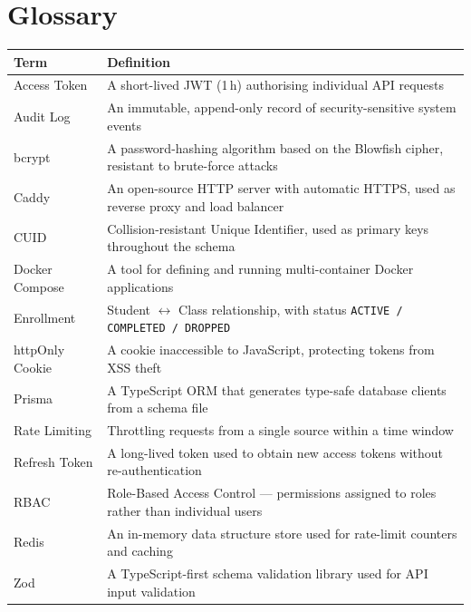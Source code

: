 \documentclass[12pt,a4paper]{article}
\begin{document}
\appendix
\section{Glossary}

\begin{tabularx}{\textwidth}{L{3.5cm} L{10cm}}
  \toprule
  \textbf{Term} & \textbf{Definition} \\
  \midrule
  Access Token & A short-lived JWT (1\,h) authorising individual API requests \\
  Audit Log & An immutable, append-only record of security-sensitive system events \\
  bcrypt & A password-hashing algorithm based on the Blowfish cipher, resistant to brute-force attacks \\
  Caddy & An open-source HTTP server with automatic HTTPS, used as reverse proxy and load balancer \\
  CUID & Collision-resistant Unique Identifier, used as primary keys throughout the schema \\
  Docker Compose & A tool for defining and running multi-container Docker applications \\
  Enrollment & Student $\leftrightarrow$ Class relationship, with status \texttt{ACTIVE / COMPLETED / DROPPED} \\
  httpOnly Cookie & A cookie inaccessible to JavaScript, protecting tokens from XSS theft \\
  Prisma & A TypeScript ORM that generates type-safe database clients from a schema file \\
  Rate Limiting & Throttling requests from a single source within a time window \\
  Refresh Token & A long-lived token used to obtain new access tokens without re-authentication \\
  RBAC & Role-Based Access Control --- permissions assigned to roles rather than individual users \\
  Redis & An in-memory data structure store used for rate-limit counters and caching \\
  Zod & A TypeScript-first schema validation library used for API input validation \\
  \bottomrule
\end{tabularx}

\end{document}

